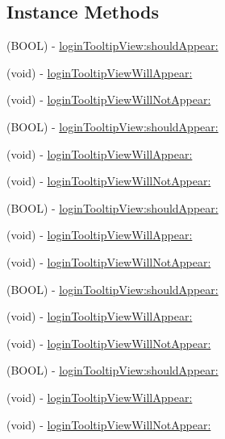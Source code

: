 \subsection*{Instance Methods}
\begin{DoxyCompactItemize}
\item 
(B\+O\+OL) -\/ \hyperlink{protocolFBLoginTooltipViewDelegate_01-p_a0b9d5ac15bf779f27017b5f8a7a32450}{login\+Tooltip\+View\+:should\+Appear\+:}
\item 
(void) -\/ \hyperlink{protocolFBLoginTooltipViewDelegate_01-p_a0d89efb9ebc19a9b47dd4116d5130631}{login\+Tooltip\+View\+Will\+Appear\+:}
\item 
(void) -\/ \hyperlink{protocolFBLoginTooltipViewDelegate_01-p_a90d8a02f0672da781a5b50e517f75685}{login\+Tooltip\+View\+Will\+Not\+Appear\+:}
\item 
(B\+O\+OL) -\/ \hyperlink{protocolFBLoginTooltipViewDelegate_01-p_a0b9d5ac15bf779f27017b5f8a7a32450}{login\+Tooltip\+View\+:should\+Appear\+:}
\item 
(void) -\/ \hyperlink{protocolFBLoginTooltipViewDelegate_01-p_a0d89efb9ebc19a9b47dd4116d5130631}{login\+Tooltip\+View\+Will\+Appear\+:}
\item 
(void) -\/ \hyperlink{protocolFBLoginTooltipViewDelegate_01-p_a90d8a02f0672da781a5b50e517f75685}{login\+Tooltip\+View\+Will\+Not\+Appear\+:}
\item 
(B\+O\+OL) -\/ \hyperlink{protocolFBLoginTooltipViewDelegate_01-p_a0b9d5ac15bf779f27017b5f8a7a32450}{login\+Tooltip\+View\+:should\+Appear\+:}
\item 
(void) -\/ \hyperlink{protocolFBLoginTooltipViewDelegate_01-p_a0d89efb9ebc19a9b47dd4116d5130631}{login\+Tooltip\+View\+Will\+Appear\+:}
\item 
(void) -\/ \hyperlink{protocolFBLoginTooltipViewDelegate_01-p_a90d8a02f0672da781a5b50e517f75685}{login\+Tooltip\+View\+Will\+Not\+Appear\+:}
\item 
(B\+O\+OL) -\/ \hyperlink{protocolFBLoginTooltipViewDelegate_01-p_a0b9d5ac15bf779f27017b5f8a7a32450}{login\+Tooltip\+View\+:should\+Appear\+:}
\item 
(void) -\/ \hyperlink{protocolFBLoginTooltipViewDelegate_01-p_a0d89efb9ebc19a9b47dd4116d5130631}{login\+Tooltip\+View\+Will\+Appear\+:}
\item 
(void) -\/ \hyperlink{protocolFBLoginTooltipViewDelegate_01-p_a90d8a02f0672da781a5b50e517f75685}{login\+Tooltip\+View\+Will\+Not\+Appear\+:}
\item 
(B\+O\+OL) -\/ \hyperlink{protocolFBLoginTooltipViewDelegate_01-p_a0b9d5ac15bf779f27017b5f8a7a32450}{login\+Tooltip\+View\+:should\+Appear\+:}
\item 
(void) -\/ \hyperlink{protocolFBLoginTooltipViewDelegate_01-p_a0d89efb9ebc19a9b47dd4116d5130631}{login\+Tooltip\+View\+Will\+Appear\+:}
\item 
(void) -\/ \hyperlink{protocolFBLoginTooltipViewDelegate_01-p_a90d8a02f0672da781a5b50e517f75685}{login\+Tooltip\+View\+Will\+Not\+Appear\+:}
\end{DoxyCompactItemize}


